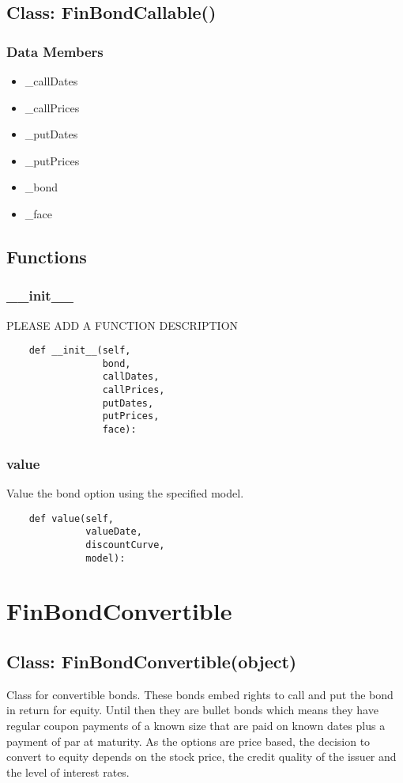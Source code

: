 \documentclass[twoside,11pt]{book}
\begin{document}
\subsection*{Class: FinBondCallable()}


\subsubsection*{Data Members}
\begin{itemize}
\item{\_callDates}
\item{\_callPrices}
\item{\_putDates}
\item{\_putPrices}
\item{\_bond}
\item{\_face}
\end{itemize}

\subsection*{Functions}

\subsubsection*{{\bf \_\_init\_\_}}
PLEASE ADD A FUNCTION DESCRIPTION

\begin{lstlisting}
    def __init__(self,
                 bond,
                 callDates,
                 callPrices,
                 putDates,
                 putPrices,
                 face):
\end{lstlisting}

\subsubsection*{{\bf value}}
Value the bond option using the specified model.  

\begin{lstlisting}
    def value(self,
              valueDate,
              discountCurve,
              model):
\end{lstlisting}

\newpage
\section{FinBondConvertible}

\subsection*{Class: FinBondConvertible(object)}
Class for convertible bonds. These bonds embed rights to call and put the bond in return for equity. Until then they are bullet bonds which means they have regular coupon payments of a known size that are paid on known dates plus a payment of par at maturity. As the options are price based, the decision to convert to equity depends on the stock price, the credit quality of the issuer and the level of interest rates. 
\end{document}
